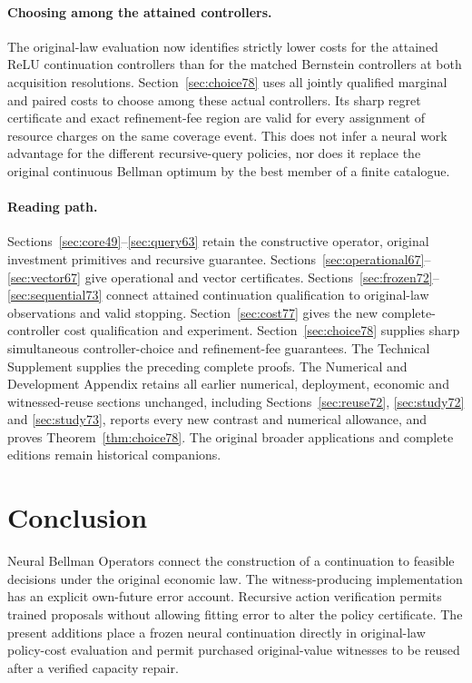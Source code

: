 \documentclass[ecta,nameyear,draft]{econsocart}
\begin{document}
\paragraph{Choosing among the attained controllers.}
The original-law evaluation now identifies strictly lower costs for the attained ReLU continuation controllers than for the matched Bernstein controllers at both acquisition resolutions. Section~\ref{sec:choice78} uses all jointly qualified marginal and paired costs to choose among these actual controllers. Its sharp regret certificate and exact refinement-fee region are valid for every assignment of resource charges on the same coverage event. This does not infer a neural work advantage for the different recursive-query policies, nor does it replace the original continuous Bellman optimum by the best member of a finite catalogue.

\paragraph{Reading path.}
Sections~\ref{sec:core49}--\ref{sec:query63} retain the constructive operator, original investment primitives and recursive guarantee. Sections~\ref{sec:operational67}--\ref{sec:vector67} give operational and vector certificates. Sections~\ref{sec:frozen72}--\ref{sec:sequential73} connect attained continuation qualification to original-law observations and valid stopping. Section~\ref{sec:cost77} gives the new complete-controller cost qualification and experiment. Section~\ref{sec:choice78} supplies sharp simultaneous controller-choice and refinement-fee guarantees. The Technical Supplement supplies the preceding complete proofs. The Numerical and Development Appendix retains all earlier numerical, deployment, economic and witnessed-reuse sections unchanged, including Sections~\ref{sec:reuse72}, \ref{sec:study72} and \ref{sec:study73}, reports every new contrast and numerical allowance, and proves Theorem~\ref{thm:choice78}. The original broader applications and complete editions remain historical companions.











\section{Conclusion}\label{sec:conclusion65}
Neural Bellman Operators connect the construction of a continuation to feasible decisions under the original economic law. The witness-producing implementation has an explicit own-future error account. Recursive action verification permits trained proposals without allowing fitting error to alter the policy certificate. The present additions place a frozen neural continuation directly in original-law policy-cost evaluation and permit purchased original-value witnesses to be reused after a verified capacity repair.
\end{document}

